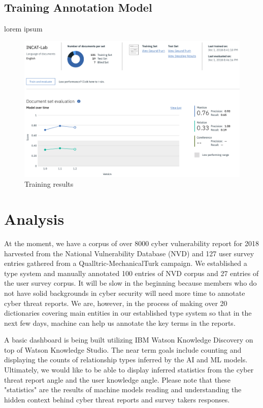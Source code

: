 \documentclass[conference]{IEEEtran}
\begin{document}
\subsection{Training Annotation Model}
lorem ipsum

\begin{figure}[ht]
  \centering
  \includegraphics[width=14cm]{./images/trainingResults}
  \caption{Training results}
  \label{Figure:trainingResults}
\end{figure}

\section{Analysis}
At the moment, we have a corpus of over 8000 cyber vulnerability report for 2018 harvested from the National Vulnerability Database (NVD) and 127 user survey entries gathered from a Qualltric-MechanicalTurk campaign. We established a type system and manually annotated 100 entries of NVD corpus and 27 entries of the user survey corpus. It will be slow in the beginning because members who do not have solid backgrounds in cyber security will need more time to annotate cyber threat reports. We are, however, in the process of making over 20 dictionaries covering main entities in our established type system so that in the next few days, machine can help us annotate the key terms in the reports.

A basic dashboard is being built utilizing IBM Watson Knowledge Discovery on top of Watson Knowledge Studio. The near term goals include counting and displaying the counts of relationship types inferred by the AI and ML models. Ultimately, we would like to be able to display inferred statistics from the cyber threat report angle and the user knowledge angle. Please note that these "statistics" are the results of machine models reading and understanding the hidden context behind cyber threat reports and survey takers responses.
\end{document}
